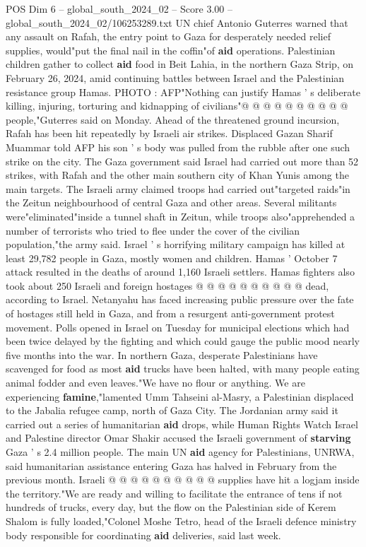 \begin{textsample}{POS Dim 6 – global\_south\_2024\_02 – Score 3.00 – global\_south\_2024\_02/106253289.txt}
UN chief Antonio Guterres warned that any assault on Rafah, the entry point to Gaza for desperately needed relief supplies, would"put the final nail in the coffin"of \textbf{aid} operations.
Palestinian children gather to collect \textbf{aid} food in Beit Lahia, in the northern Gaza Strip, on February 26, 2024, amid continuing battles between Israel and the Palestinian resistance group Hamas.
PHOTO : AFP"Nothing can justify Hamas ' s deliberate killing, injuring, torturing and kidnapping of civilians"@ @ @ @ @ @ @ @ @ @ people,"Guterres said on Monday.
Ahead of the threatened ground incursion, Rafah has been hit repeatedly by Israeli air strikes.
Displaced Gazan Sharif Muammar told AFP his son ' s body was pulled from the rubble after one such strike on the city.
The Gaza government said Israel had carried out more than 52 strikes, with Rafah and the other main southern city of Khan Yunis among the main targets.
The Israeli army claimed troops had carried out"targeted raids"in the Zeitun neighbourhood of central Gaza and other areas.
Several militants were"eliminated"inside a tunnel shaft in Zeitun, while troops also"apprehended a number of terrorists who tried to flee under the cover of the civilian population,"the army said.
Israel ' s horrifying military campaign has killed at least 29,782 people in Gaza, mostly women and children.
Hamas ' October 7 attack resulted in the deaths of around 1,160 Israeli settlers.
Hamas fighters also took about 250 Israeli and foreign hostages @ @ @ @ @ @ @ @ @ @ dead, according to Israel.
Netanyahu has faced increasing public pressure over the fate of hostages still held in Gaza, and from a resurgent anti-government protest movement.
Polls opened in Israel on Tuesday for municipal elections which had been twice delayed by the fighting and which could gauge the public mood nearly five months into the war.
In northern Gaza, desperate Palestinians have scavenged for food as most \textbf{aid} trucks have been halted, with many people eating animal fodder and even leaves."We have no flour or anything.
We are experiencing \textbf{famine},"lamented Umm Tahseini al-Masry, a Palestinian displaced to the Jabalia refugee camp, north of Gaza City.
The Jordanian army said it carried out a series of humanitarian \textbf{aid} drops, while Human Rights Watch Israel and Palestine director Omar Shakir accused the Israeli government of \textbf{starving} Gaza ' s 2.4 million people.
The main UN \textbf{aid} agency for Palestinians, UNRWA, said humanitarian assistance entering Gaza has halved in February from the previous month.
Israeli @ @ @ @ @ @ @ @ @ @ supplies have hit a logjam inside the territory."We are ready and willing to facilitate the entrance of tens if not hundreds of trucks, every day, but the flow on the Palestinian side of Kerem Shalom is fully loaded,"Colonel Moshe Tetro, head of the Israeli defence ministry body responsible for coordinating \textbf{aid} deliveries, said last week.

\end{textsample}
